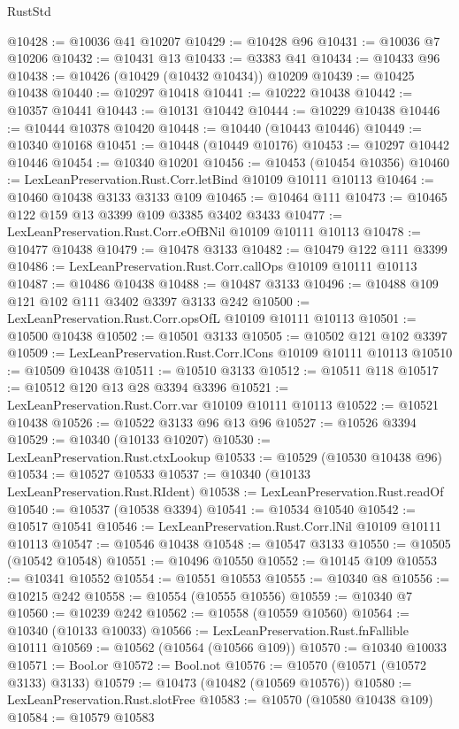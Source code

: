 \begin{lexlean}{RustStd}
\begin{coremodule}
@10428 := @10036 @41 @10207
@10429 := @10428 @96
@10431 := @10036 @7 @10206
@10432 := @10431 @13
@10433 := @3383 @41
@10434 := @10433 @96
@10438 := @10426 (@10429 (@10432 @10434)) @10209
@10439 := @10425 @10438
@10440 := @10297 @10418
@10441 := @10222 @10438
@10442 := @10357 @10441
@10443 := @10131 @10442
@10444 := @10229 @10438
@10446 := @10444 @10378 @10420
@10448 := @10440 (@10443 @10446)
@10449 := @10340 @10168
@10451 := @10448 (@10449 @10176)
@10453 := @10297 @10442 @10446
@10454 := @10340 @10201
@10456 := @10453 (@10454 @10356)
@10460 := LexLeanPreservation.Rust.Corr.letBind @10109 @10111 @10113
@10464 := @10460 @10438 @3133 @3133 @109
@10465 := @10464 @111
@10473 := @10465 @122 @159 @13 @3399 @109 @3385 @3402 @3433
@10477 := LexLeanPreservation.Rust.Corr.eOfBNil @10109 @10111 @10113
@10478 := @10477 @10438
@10479 := @10478 @3133
@10482 := @10479 @122 @111 @3399
@10486 := LexLeanPreservation.Rust.Corr.callOps @10109 @10111 @10113
@10487 := @10486 @10438
@10488 := @10487 @3133
@10496 := @10488 @109 @121 @102 @111 @3402 @3397 @3133 @242
@10500 := LexLeanPreservation.Rust.Corr.opsOfL @10109 @10111 @10113
@10501 := @10500 @10438
@10502 := @10501 @3133
@10505 := @10502 @121 @102 @3397
@10509 := LexLeanPreservation.Rust.Corr.lCons @10109 @10111 @10113
@10510 := @10509 @10438
@10511 := @10510 @3133
@10512 := @10511 @118
@10517 := @10512 @120 @13 @28 @3394 @3396
@10521 := LexLeanPreservation.Rust.Corr.var @10109 @10111 @10113
@10522 := @10521 @10438
@10526 := @10522 @3133 @96 @13 @96
@10527 := @10526 @3394
@10529 := @10340 (@10133 @10207)
@10530 := LexLeanPreservation.Rust.ctxLookup
@10533 := @10529 (@10530 @10438 @96)
@10534 := @10527 @10533
@10537 := @10340 (@10133 LexLeanPreservation.Rust.RIdent)
@10538 := LexLeanPreservation.Rust.readOf
@10540 := @10537 (@10538 @3394)
@10541 := @10534 @10540
@10542 := @10517 @10541
@10546 := LexLeanPreservation.Rust.Corr.lNil @10109 @10111 @10113
@10547 := @10546 @10438
@10548 := @10547 @3133
@10550 := @10505 (@10542 @10548)
@10551 := @10496 @10550
@10552 := @10145 @109
@10553 := @10341 @10552
@10554 := @10551 @10553
@10555 := @10340 @8
@10556 := @10215 @242
@10558 := @10554 (@10555 @10556)
@10559 := @10340 @7
@10560 := @10239 @242
@10562 := @10558 (@10559 @10560)
@10564 := @10340 (@10133 @10033)
@10566 := LexLeanPreservation.Rust.fnFallible @10111
@10569 := @10562 (@10564 (@10566 @109))
@10570 := @10340 @10033
@10571 := Bool.or
@10572 := Bool.not
@10576 := @10570 (@10571 (@10572 @3133) @3133)
@10579 := @10473 (@10482 (@10569 @10576))
@10580 := LexLeanPreservation.Rust.slotFree
@10583 := @10570 (@10580 @10438 @109)
@10584 := @10579 @10583

\end{coremodule}
\end{lexlean}
